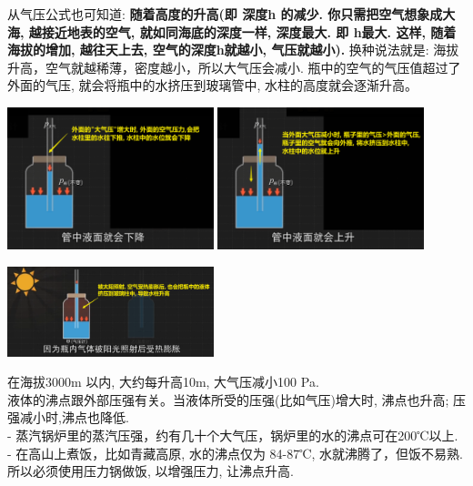 \documentclass[UTF8]{ctexart}
\begin{document}
	从气压公式也可知道: \textbf{随着高度的升高(即 深度h 的减少. 你只需把空气想象成大海, 越接近地表的空气, 就如同海底的深度一样, 深度最大. 即 h最大. 这样, 随着海拔的增加, 越往天上去, 空气的深度h就越小, 气压就越小).}  换种说法就是: 海拔升高，空气就越稀薄，密度越小，所以大气压会减小. 瓶中的空气的气压值超过了外面的气压, 就会将瓶中的水挤压到玻璃管中,  水柱的高度就会逐渐升高。
	
	\includegraphics[width=0.45\textwidth]{img/0032.png} 
	\includegraphics[width=0.45\textwidth]{img/0033.png} 
	
	\includegraphics[width=0.45\textwidth]{img/0036.png} 	
	
	在海拔3000m 以内, 大约每升高10m, 大气压减小100 Pa. \\
	
	液体的沸点跟外部压强有关。当液体所受的压强(比如气压)增大时, 沸点也升高; 压强减小时,沸点也降低.   \\	
	- 蒸汽锅炉里的蒸汽压强，约有几十个大气压，锅炉里的水的沸点可在200℃以上. \\	
	- 在高山上煮饭，比如青藏高原, 水的沸点仅为 84-87℃, 水就沸腾了，但饭不易熟. 所以必须使用压力锅做饭, 以增强压力, 让沸点升高.
	
	
	
	
	
	
	
	\vspace{1em} 
	
\end{document}
